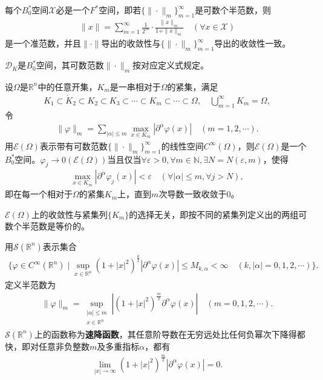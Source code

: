 \documentclass[../../main.tex]{subfiles}%
\begin{document}
\begin{proposition}
每个$B_0^*$空间$\mathscr{X}$必是一个$F^*$空间，即若$\{\|\cdot\|_m\}_{m=1}^\infty$是可数个半范数，则
\begin{align*}
\|x\|=\sum\limits_{m=1}^\infty\frac{1}{2^m}\cdot\frac{\|x\|_m}{1+\|x\|_m}\quad(\forall x\in\mathscr{X})
\end{align*}
是一个准范数，并且$\|\cdot\|$导出的收敛性与$\{\|\cdot\|_m\}_{m=1}^\infty$导出的收敛性一致。
\end{proposition}

\begin{example}
$\mathscr{D}_K$是$B_0^*$空间，其可数范数$\|\cdot\|_m$按对应定义式规定。
\end{example}

\begin{example}\label{example:泛函分析--例4.2.6}
设$\Omega$是$\mathbb{R}^n$中的任意开集，$K_m$是一串相对于$\Omega$的紧集，满足
\begin{align*}
K_1\subset\mathring{K}_2\subset K_2\subset K_3\subset\cdots\subset K_m\subset\cdots\subset\Omega,\quad \bigcup\limits_{m=1}^\infty K_m=\Omega,
\end{align*}
令
\begin{align*}
\|\varphi\|_m=\sum\limits_{|\alpha|\leqslant m}\max\limits_{x\in K_m}|\partial^\alpha\varphi(x)|\quad(m=1,2,\cdots).
\end{align*}
用$\mathscr{E}(\Omega)$表示带有可数范数$\{\|\cdot\|_m\}_{m=1}^\infty$的线性空间$C^\infty(\Omega)$，则$\mathscr{E}(\Omega)$是一个$B_0^*$空间。$\varphi_j\to0(\mathscr{E}(\Omega))$当且仅当$\forall\varepsilon>0,\forall m\in\mathbb{N},\exists N=N(\varepsilon,m)$，使得
\begin{align*}
\max\limits_{x\in K_m}|\partial^\alpha\varphi_j(x)|<\varepsilon\quad(\forall|\alpha|\leqslant m,\forall j>N),
\end{align*}
即在每一个相对于$\Omega$的紧集$K_m$上，直到$m$次导数一致收敛于$0$。

$\mathscr{E}(\Omega)$上的收敛性与紧集列$\{K_m\}$的选择无关，即按不同的紧集列定义出的两组可数个半范数是等价的。
\end{example}

\begin{example}
用$\mathscr{S}(\mathbb{R}^n)$表示集合
\begin{align*}
\{\varphi\in C^\infty(\mathbb{R}^n)\mid\sup\limits_{x\in\mathbb{R}^n}(1+|x|^2)^{\frac{k}{2}}|\partial^\alpha\varphi(x)|\leqslant M_{k,\alpha}<\infty\quad(k,|\alpha|=0,1,2,\cdots)\}.
\end{align*}
定义半范数为
\begin{align*}
\|\varphi\|_m=\sup\limits_{\substack{|\alpha|\leqslant m\\x\in\mathbb{R}^n}}\left|(1+|x|^2)^{\frac{m}{2}}\partial^\alpha\varphi(x)\right|\quad(m=0,1,2,\cdots).
\end{align*}
$\mathscr{S}(\mathbb{R}^n)$上的函数称为\textbf{速降函数}，其任意阶导数在无穷远处比任何负幂次下降得都快，即对任意非负整数$m$及多重指标$\alpha$，都有
\begin{align*}
\lim\limits_{|x|\to\infty}(1+|x|^2)^{\frac{m}{2}}|\partial^\alpha\varphi(x)|=0.
\end{align*}
\end{example}
\end{document}
